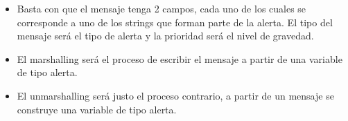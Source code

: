 \begin{problem}[13]
      \spart

      \begin{itemize}
        \item Basta con que el mensaje tenga 2 campos, cada uno de los cuales se corresponde a uno de los strings que forman parte de la alerta. El tipo del mensaje será el tipo de alerta y la prioridad será el nivel de gravedad.

        \item El marshalling será el proceso de escribir el mensaje a partir de una variable de tipo alerta.

        \item El unmarshalling será justo el proceso contrario, a partir de un mensaje se construye una variable de tipo alerta.
      \end{itemize}

      \end{problem}


